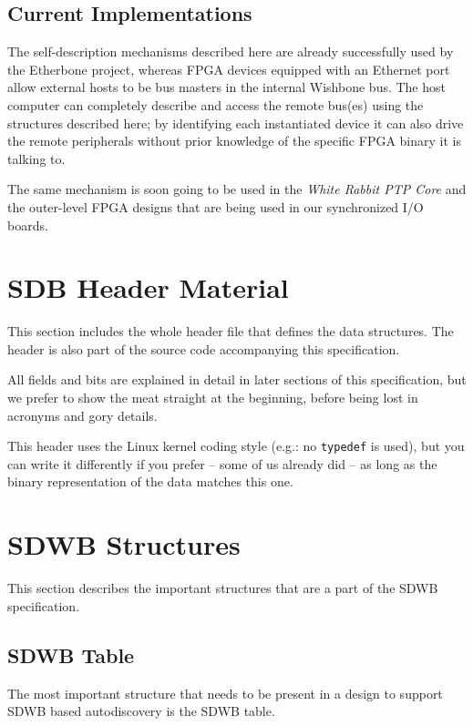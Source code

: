\documentclass[a4paper, 12pt]{article}
\begin{document}
\subsection{Current Implementations}

The self-description mechanisms described here are already
successfully used by the Etherbone project, whereas FPGA devices
equipped with an Ethernet port allow external hosts to be bus masters
in the internal Wishbone bus.  The host computer can completely
describe and access the remote bus(es) using the structures described
here; by identifying each instantiated device it can also drive the
remote peripherals without prior knowledge of the specific FPGA binary
it is talking to.

The same mechanism is soon going to be used in the \textit{White
Rabbit PTP Core} and the outer-level FPGA designs that are
being used in our synchronized I/O boards.

\section{SDB Header Material}

This section includes the whole header file that defines the data
structures. The header is also part of the source code accompanying
this specification.

All fields and bits are explained in detail in later sections of this
specification, but we prefer to show the meat straight at the
beginning, before being lost in acronyms and gory details.

This header uses the Linux kernel coding style (e.g.: no \texttt{typedef} is used),
but you can write it differently if you prefer -- some of us already did -- as
long as the binary representation of the data matches this one.

\footnotesize

\normalsize

\section{SDWB Structures}

This section describes the important structures that are a part of the SDWB specification.

\subsection{SDWB Table}

The most important structure that needs to be present in a design to support SDWB
based autodiscovery is the SDWB table.
\end{document}
